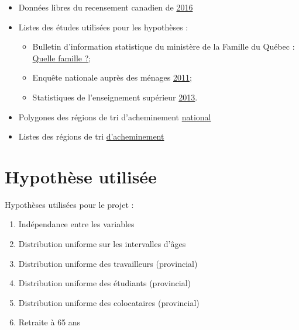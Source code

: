 \documentclass[11pt,french]{article}\usepackage[]{graphicx}\usepackage[]{color}
\begin{document}
\begin{itemize}
\item Données libres du recensement canadien de \href{http://www12.statcan.gc.ca/census-recensement/2016/dp-pd/prof/details/download-telecharger/comp/page_dl-tc.cfm?Lang=F}{2016} 
\item Listes des études utilisées pour les hypothèses :
     \begin{itemize}
     \item Bulletin d'information statistique du ministère de la Famille du Québec : \href{https://www.mfa.gouv.qc.ca/fr/Famille/chiffres-famille-quebec/bulletin_quelle_famille/Pages/aut2013_no1_tab4.aspx}{Quelle famille ?};
     \item Enquête nationale auprès des ménages \href{http://www12.statcan.gc.ca/nhs-enm/2011/dp-pd/dt-td/Rp-fra.cfm?TABID=2&LANG=F&A=R&APATH=3&DETAIL=0&DIM=0&FL=A&FREE=0&GC=24&GL=-1&GID=1118301&GK=1&GRP=1&O=D&PID=106042&PRID=0&PTYPE=105277&S=0&SHOWALL=0&SUB=0&Temporal=2013&THEME=96&VID=0&VNAMEE=&VNAMEF=&D1=2&D2=0&D3=0&D4=0&D5=0&D6=0}{2011};
     \item Statistiques de l'enseignement supérieur \href{http://www.education.gouv.qc.ca/fileadmin/administration/librairies/documents/Ministere/acces_info/Statistiques/Statistiques_ES/Statistiques_enseignement_superieur_2013.pdf}{2013}.
     \end{itemize}
\item Polygones des régions de tri d'acheminement \href{http://www12.statcan.gc.ca/census-recensement/2011/geo/bound-limit/bound-limit-2016-fra.cfm}{national}
\item Listes des régions de tri \href{https://fr.wikipedia.org/wiki/Liste_des_codes_postaux_canadiens_débutant_par_J}{d'acheminement}
\end{itemize}

\section{Hypothèse utilisée}

Hypothèses utilisées pour le projet :
\begin{enumerate}
\item Indépendance entre les variables
\item Distribution uniforme sur les intervalles d'âges
\item Distribution uniforme des travailleurs (provincial)
\item Distribution uniforme des étudiants (provincial)
\item Distribution uniforme des colocataires (provincial)
\item Retraite à 65 ans
\end{enumerate}
\end{document}
